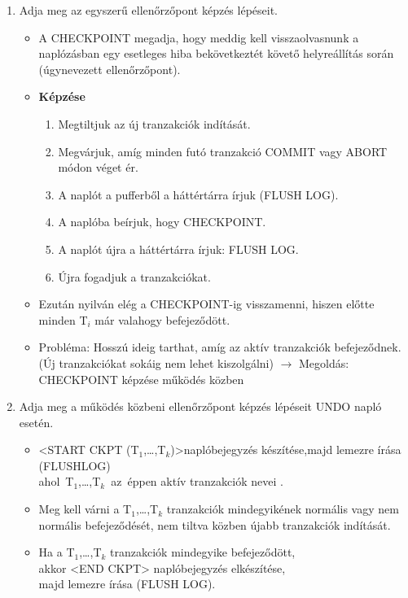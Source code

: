\documentclass[a4paper,11.5pt, table]{article}
\begin{document}
\begin{enumerate}
	\item Adja meg az egyszerű ellenőrzőpont képzés lépéseit.
		\begin{itemize}
			\item A CHECKPOINT megadja, hogy meddig kell visszaolvasnunk a naplózásban egy esetleges hiba bekövetkeztét követő helyreállítás során (úgynevezett ellenőrzőpont).
			\item \textbf{Képzése}
			\begin{enumerate}
				\item Megtiltjuk az új tranzakciók indítását.
				\item Megvárjuk, amíg minden futó tranzakció COMMIT vagy ABORT módon véget ér.
				\item A naplót a pufferből a háttértárra írjuk (FLUSH LOG).
				\item A naplóba beírjuk, hogy CHECKPOINT.
				\item A naplót újra a háttértárra írjuk: FLUSH LOG.
				\item Újra fogadjuk a tranzakciókat.
			\end{enumerate}
			
			\item Ezután nyilván elég a CHECKPOINT-ig visszamenni, hiszen előtte minden T$_{i}$ már valahogy befejeződött.
			
			\item Probléma: Hosszú ideig tarthat, amíg az aktív tranzakciók befejeződnek. (Új tranzakciókat sokáig nem lehet kiszolgálni) $\rightarrow$ Megoldás: CHECKPOINT képzése működés közben
		\end{itemize}
	
	\item Adja meg a működés közbeni ellenőrzőpont képzés lépéseit UNDO napló esetén.
		\begin{itemize}
			\item <START CKPT (T$_{1}$,\ldots,T$_{k}$)>naplóbejegyzés készítése,majd lemezre írása (FLUSHLOG)\\			
			ahol\ T$_{1}$,\ldots,T$_{k}$\ az\ éppen aktív tranzakciók nevei .
			\item Meg kell várni a T$_{1}$,\ldots,T$_{k}$ tranzakciók mindegyikének normális vagy nem normális befejeződését, nem tiltva közben újabb tranzakciók indítását.
			\item Ha a T$_{1}$,\ldots,T$_{k}$ tranzakciók mindegyike befejeződött,\\
			akkor <END CKPT> naplóbejegyzés elkészítése,\\
			majd lemezre írása (FLUSH LOG).
			

\end{itemize}
\end{enumerate}
\end{document}
